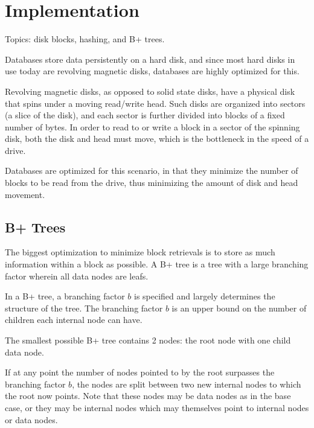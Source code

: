\chapter{Implementation}

Topics: disk blocks, hashing, and B+ trees.

Databases store data persistently on a hard disk, and since most hard
disks in use today are revolving magnetic disks, databases are highly
optimized for this.

Revolving magnetic disks, as opposed to solid state disks, have a
physical disk that spins under a moving read/write head.  Such disks
are organized into sectors (a slice of the disk), and each sector is
further divided into blocks of a fixed number of bytes.  In order to
read to or write a block in a sector of the spinning disk, both the
disk and head must move, which is the bottleneck in the speed of a
drive.

Databases are optimized for this scenario, in that they minimize the
number of blocks to be read from the drive, thus minimizing the amount
of disk and head movement.

\section{B+ Trees}

The biggest optimization to minimize block retrievals is to store as
much information within a block as possible.  A B+ tree is a tree with
a large branching factor wherein all data nodes are leafs.

In a B+ tree, a branching factor $b$ is specified and largely
determines the structure of the tree.  The branching factor $b$ is an
upper bound on the number of children each internal node can have.

The smallest possible B+ tree contains 2 nodes: the root node with one
child data node.  

If at any point the number of nodes pointed to by the root surpasses
the branching factor $b$, the nodes are split between two new internal
nodes to which the root now points.  Note that these nodes may be data
nodes as in the base case, or they may be internal nodes which may
themselves point to internal nodes or data nodes.



